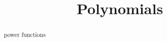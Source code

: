 \documentclass{ximera}
\title{Polynomials}
\begin{document}
\begin{abstract}
power functions
\end{abstract}
\maketitle
\end{document}
